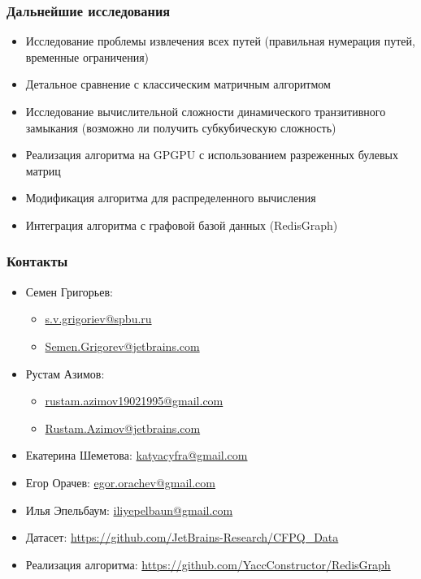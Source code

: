\documentclass[xcolor=table,english,russian]{beamer}
\begin{document}
\begin{frame}[fragile] \frametitle{Дальнейшие исследования}
  \begin{itemize}
  	\item Исследование проблемы извлечения всех путей (правильная нумерация путей, временные ограничения)
  	\item Детальное сравнение с классическим матричным алгоритмом
  	\item Исследование вычислительной сложности динамического транзитивного замыкания (возможно ли получить субкубическую сложность)
  	\item Реализация алгоритма на GPGPU с использованием разреженных булевых матриц
  	\item Модификация алгоритма для распределенного вычисления 
  	\item Интеграция алгоритма с графовой базой данных (RedisGraph)
\end{itemize}
\end{frame}

\begin{frame} \frametitle{Контакты}
    \begin{itemize}
        \item Семен Григорьев:
        \begin{itemize}
          \item \href{mailto:s.v.grigoriev@spbu.ru}{s.v.grigoriev@spbu.ru}
          \item \href{mailto:Semen.Grigorev@jetbrains.com}{Semen.Grigorev@jetbrains.com}
        \end{itemize}
        \item Рустам Азимов:
        \begin{itemize}
      	    \item \href{mailto:rustam.azimov19021995@gmail.com}{rustam.azimov19021995@gmail.com}
      	    \item \href{mailto:Rustam.Azimov@jetbrains.com}{Rustam.Azimov@jetbrains.com}
        \end{itemize}
        \item Екатерина Шеметова:  \href{mailto:katyacyfra@gmail.com}{katyacyfra@gmail.com}
        \item Егор Орачев: \href{mailto:egor.orachev@gmail.com}{egor.orachev@gmail.com}
        \item Илья Эпельбаум: \href{mailto:iliyepelbaun@gmail.com}{iliyepelbaun@gmail.com}
        \vspace{0.5cm}
        \item Датасет: \href{https://github.com/JetBrains-Research/CFPQ_Data}{https://github.com/JetBrains-Research/CFPQ\_Data}
        \item Реализация алгоритма: \href{https://github.com/YaccConstructor/RedisGraph}{https://github.com/YaccConstructor/RedisGraph}
    \end{itemize}
    \vspace{0.1cm}
\end{frame}
\end{document}
